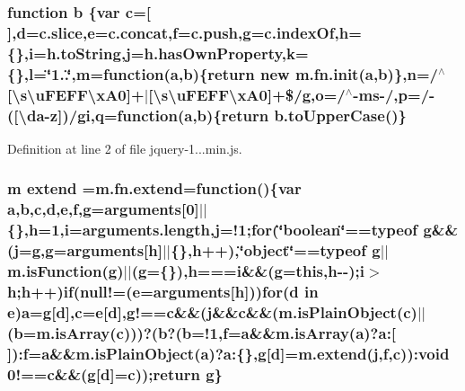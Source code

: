 \subsubsection[{\texorpdfstring{b}{b}}]{\setlength{\rightskip}{0pt plus 5cm}function b \{var {\bf c}=\mbox{[}$\,$\mbox{]},{\bf d}=c.\+slice,{\bf e}=c.\+concat,{\bf f}=c.\+push,{\bf g}={\bf c.\+index\+Of},{\bf h}=\{\},{\bf i}=h.\+to\+String,j=h.\+has\+Own\+Property,{\bf k}=\{\},{\bf l}=\char`\"{}1..\char`\"{},{\bf m}=function({\bf a},b)\{return new m.\+fn.\+init({\bf a},b)\},{\bf n}=/$^\wedge$\mbox{[}\textbackslash{}s\textbackslash{}u\+F\+E\+F\+F\textbackslash{}x\+A0\mbox{]}+$\vert$\mbox{[}\textbackslash{}s\textbackslash{}u\+F\+E\+F\+F\textbackslash{}x\+A0\mbox{]}+\$/{\bf g},{\bf o}=/$^\wedge$-\/ms-\//,{\bf p}=/-\/(\mbox{[}\textbackslash{}da-\/{\bf z}\mbox{]})/gi,q=function({\bf a},b)\{return b.\+to\+Upper\+Case()\}}\hypertarget{jquery-1_811_81_8min_8js_ac0431efac4d7c393d1e70b86115cb93f}{}\label{jquery-1_811_81_8min_8js_ac0431efac4d7c393d1e70b86115cb93f}


Definition at line 2 of file jquery-\/1...\+min.\+js.

\subsubsection[{\texorpdfstring{extend}{extend}}]{ {\bf m} extend =m.\+fn.\+extend=function()\{var {\bf a},{\bf b},{\bf c},{\bf d},{\bf e},{\bf f},{\bf g}=arguments\mbox{[}0\mbox{]}$\vert$$\vert$\{\},{\bf h}=1,{\bf i}=arguments.\+length,j=!1;{\bf for}(\char`\"{}boolean\char`\"{}==typeof {\bf g}\&\&(j={\bf g},{\bf g}=arguments\mbox{[}{\bf h}\mbox{]}$\vert$$\vert$\{\},{\bf h}++),\char`\"{}object\char`\"{}==typeof {\bf g}$\vert$$\vert$m.\+is\+Function({\bf g})$\vert$$\vert$({\bf g}=\{\}),{\bf h}==={\bf i}\&\&({\bf g}={\bf this},{\bf h}-\/-\/);{\bf i}$>${\bf h};{\bf h}++){\bf if}(null!=({\bf e}=arguments\mbox{[}{\bf h}\mbox{]})){\bf for}({\bf d} in {\bf e}){\bf a}={\bf g}\mbox{[}{\bf d}\mbox{]},{\bf c}={\bf e}\mbox{[}{\bf d}\mbox{]},g!=={\bf c}\&\&(j\&\&{\bf c}\&\&(m.\+is\+Plain\+Object({\bf c})$\vert$$\vert$({\bf b}=m.\+is\+Array({\bf c})))?({\bf b}?({\bf b}=!1,{\bf f}={\bf a}\&\&m.\+is\+Array({\bf a})?a\+:\mbox{[}$\,$\mbox{]})\+:{\bf f}={\bf a}\&\&m.\+is\+Plain\+Object({\bf a})?a\+:\{\},{\bf g}\mbox{[}{\bf d}\mbox{]}=m.\+extend(j,{\bf f},{\bf c}))\+:void 0!=={\bf c}\&\&({\bf g}\mbox{[}{\bf d}\mbox{]}={\bf c}));return {\bf g}\}}\hypertarget{jquery-1_811_81_8min_8js_a167947be5252c14d5389d8a01a8c8545}{}\label{jquery-1_811_81_8min_8js_a167947be5252c14d5389d8a01a8c8545}


